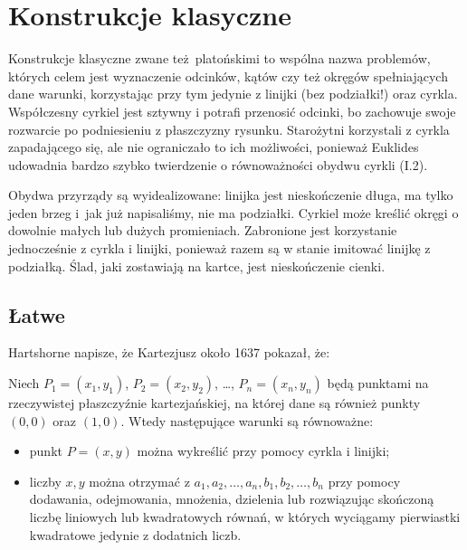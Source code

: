 %

\chapter{Konstrukcje klasyczne}
Konstrukcje klasyczne zwane też platońskimi to wspólna nazwa problemów, których celem jest wyznaczenie odcinków, kątów czy też okręgów spełniających dane warunki, korzystając przy tym jedynie z linijki (bez podziałki!) oraz cyrkla.
Współczesny cyrkiel jest sztywny i potrafi przenosić odcinki, bo zachowuje swoje rozwarcie po podniesieniu z płaszczyzny rysunku.
Starożytni korzystali z cyrkla zapadającego się, ale nie ograniczało to ich możliwości, ponieważ Euklides udowadnia bardzo szybko twierdzenie o równoważności obydwu cyrkli (I.2).

Obydwa przyrządy są wyidealizowane: linijka jest nieskończenie długa, ma tylko jeden brzeg i~jak już napisaliśmy, nie ma podziałki.
Cyrkiel może kreślić okręgi o dowolnie małych lub dużych promieniach.
Zabronione jest korzystanie jednocześnie z cyrkla i linijki, ponieważ razem są w stanie imitować linijkę z podziałką.
Ślad, jaki zostawiają na kartce, jest nieskończenie cienki.

\section{Łatwe}
Hartshorne \cite[s. 122]{hartshorne2000} napisze, że Kartezjusz około 1637 pokazał, że:

\begin{proposition}
    Niech $P_1 = (x_1, y_1)$, $P_2 = (x_2, y_2)$, \ldots, $P_n = (x_n, y_n)$ będą punktami na rzeczywistej płaszczyźnie kartezjańskiej, na której dane są również punkty $(0, 0)$ oraz $(1, 0)$.
    Wtedy następujące warunki są równoważne:
    \begin{itemize}
        \item punkt $P = (x, y)$ można wykreślić przy pomocy cyrkla i linijki;
        \item liczby $x, y$ można otrzymać z $a_1, a_2, \ldots, a_n, b_1, b_2, \ldots, b_n$ przy pomocy dodawania, odejmowania, mnożenia, dzielenia lub rozwiązując skończoną liczbę liniowych lub kwadratowych równań, w których wyciągamy pierwiastki kwadratowe jedynie z dodatnich liczb.
    \end{itemize}
\end{proposition}

